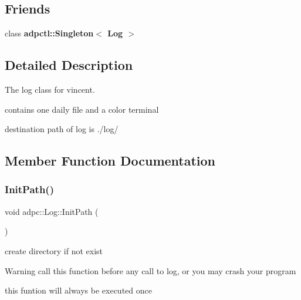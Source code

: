 \subsection*{Friends}
\begin{DoxyCompactItemize}
\item 
\mbox{\label{classadpc_1_1Log_a0e7b4c16064e3789d935b1b3523d78c7}} 
class {\bfseries adpctl\+::\+Singleton$<$ Log $>$}
\end{DoxyCompactItemize}


\subsection{Detailed Description}
The log class for vincent. 

contains one daily file and a color terminal

destination path of log is ./log/ 

\subsection{Member Function Documentation}
\mbox{\label{classadpc_1_1Log_a41b80ba97a00d128777d22f369bc791f}} 
\subsubsection{\texorpdfstring{Init\+Path()}{InitPath()}}
{\footnotesize\ttfamily void adpc\+::\+Log\+::\+Init\+Path (\begin{DoxyParamCaption}{ }\end{DoxyParamCaption})\hspace{0.3cm}{\ttfamily [static]}}



create directory if not exist 

\begin{DoxyWarning}{Warning}
call this function before any call to log, or you may crash your program
\end{DoxyWarning}
this funtion will always be executed once \mbox{\label{classadpc_1_1Log_ae3e21b4038776f15d0b5ebdfebc41f57}} 
